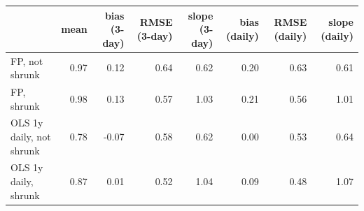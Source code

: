 \begin{tabular}{lrrrrrrr}
\toprule
 & mean & bias (3-day) & RMSE (3-day) & slope (3-day) & bias (daily) & RMSE (daily) & slope (daily) \\
\midrule
FP, not shrunk & 0.97 & 0.12 & 0.64 & 0.62 & 0.20 & 0.63 & 0.61 \\
FP, shrunk & 0.98 & 0.13 & 0.57 & 1.03 & 0.21 & 0.56 & 1.01 \\
OLS 1y daily, not shrunk & 0.78 & -0.07 & 0.58 & 0.62 & 0.00 & 0.53 & 0.64 \\
OLS 1y daily, shrunk & 0.87 & 0.01 & 0.52 & 1.04 & 0.09 & 0.48 & 1.07 \\
\bottomrule
\end{tabular}
